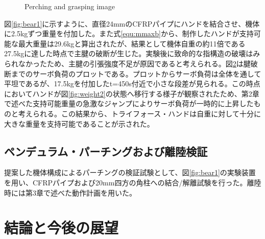 \documentclass{jarticle}
\begin{document}
\begin{figure}[tb]
\begin{subfigure}{0.6\columnwidth}
    \vspace{-6mm}
    \caption{}
    \label{fig:bear2}
  \end{subfigure}
  \vspace{2mm}
  \caption{Perching and grasping image}
  \vspace{-5mm}
\end{figure}
図\ref{fig:bear1}に示すように、直径24mmのCFRPパイプにハンドを結合させ、機体に2.5kgずつ重量を付加した。また式\ref{equ:mmaxb}から、制作したハンドが支持可能な最大重量は29.6kgと算出されたが、結果として機体自重の約11倍である27.5kgに達した時点で主腱の破断が生じた。実験後に致命的な指構造の破壊はみられなかったため、主腱の引張強度不足が原因であると考えられる。図\ref{fig:bear2}は腱破断までのサーボ負荷のプロットである。プロットからサーボ負荷は全体を通して平坦であるが、17.5kgを付加したt=450s付近で小さな段差が見られる。この時点においてハンドが図\ref{fig:weight2}の状態へ移行する様子が観察されたため、第2章で述べた支持可能重量の急激なジャンプによりサーボ負荷が一時的に上昇したものと考えられる。この結果から、トライフォース・ハンドは自重に対して十分に大きな重量を支持可能であることが示された。
\subsection{ペンデュラム・パーチングおよび離陸検証}
提案した機体構成によるパーチングの検証試験として、図\ref{fig:bear1}の実験装置を用い、CFRPパイプおよび20mm四方の角柱への結合/解離試験を行った。離陸時には第3章で述べた動作計画を用いた。

\section{結論と今後の展望}

\footnotesize





\normalsize
\end{document}
